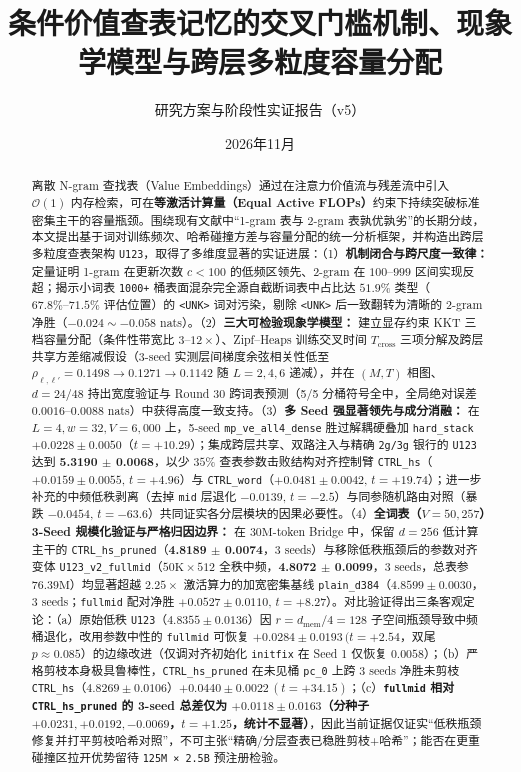 \documentclass[10.5pt,a4paper]{ctexart}
\title{\textbf{条件价值查表记忆的交叉门槛机制、现象学模型与跨层多粒度容量分配}}
\author{研究方案与阶段性实证报告（v5）}
\date{2026年11月}
\begin{document}
\maketitle

\begin{abstract}
\noindent
离散 N-gram 查找表（Value Embeddings）通过在注意力价值流与残差流中引入 $\mathcal{O}(1)$ 内存检索，可在\textbf{等激活计算量（Equal Active FLOPs）}约束下持续突破标准密集主干的容量瓶颈。围绕现有文献中“1-gram 表与 2-gram 表孰优孰劣”的长期分歧，本文提出基于词对训练频次、哈希碰撞方差与容量分配的统一分析框架，并构造出跨层多粒度查表架构 \texttt{U123}，取得了多维度显著的实证进展：（1）\textbf{机制闭合与跨尺度一致律：} 定量证明 1-gram 在更新次数 $c<100$ 的低频区领先、2-gram 在 $100\text{--}999$ 区间实现反超；揭示小词表 \texttt{1000+} 桶表面混杂完全源自截断词表中占比达 $51.9\%$ 类型（$67.8\%\text{--}71.5\%$ 评估位置）的 \texttt{<UNK>} 词对污染，剔除 \texttt{<UNK>} 后一致翻转为清晰的 2-gram 净胜（$-0.024 \sim -0.058$ nats）。（2）\textbf{三大可检验现象学模型：} 建立显存约束 KKT 三档容量分配（条件性带宽比 $3\text{--}12\times$）、Zipf--Heaps 训练交叉时间 $T_{\text{cross}}$ 三项分解及跨层共享方差缩减假设（3-seed 实测层间梯度余弦相关性低至 $\rho_{\ell,\ell'} = 0.1498 \to 0.1271 \to 0.1142$ 随 $L=2,4,6$ 递减），并在 $(M,T)$ 相图、$d=24/48$ 持出宽度验证与 Round 30 跨词表预测（5/5 分桶符号全中，全局绝对误差 $0.0016\text{--}0.0088$ nats）中获得高度一致支持。（3）\textbf{多 Seed 强显著领先与成分消融：} 在 $L=4,w=32,V=6{,}000$ 上，5-seed \texttt{mp\_ve\_all4\_dense} 胜过解耦硬叠加 \texttt{hard\_stack} $+0.0228 \pm 0.0050$（$t=+10.29$）；集成跨层共享、双路注入与精确 \texttt{2g/3g} 银行的 \texttt{U123} 达到 \textbf{5.3190 $\pm$ 0.0068}，以少 $35\%$ 查表参数击败结构对齐控制臂 \texttt{CTRL\_hs}（$+0.0159 \pm 0.0055, \, t=+4.96$）与 \texttt{CTRL\_word}（$+0.0481 \pm 0.0042, \, t=+19.74$）；进一步补充的中频低秩剥离（去掉 \texttt{mid} 层退化 $-0.0139, \, t=-2.5$）与同参随机路由对照（暴跌 $-0.0454, \, t=-63.6$）共同证实各分层模块的因果必要性。（4）\textbf{全词表（$V=50{,}257$）3-Seed 规模化验证与严格归因边界：} 在 $30\text{M}$-token Bridge 中，保留 $d=256$ 低计算主干的 \texttt{CTRL\_hs\_pruned}（\textbf{4.8189 $\pm$ 0.0074}，3 seeds）与移除低秩瓶颈后的参数对齐变体 \texttt{U123\_v2\_fullmid}（$50\text{K} \times 512$ 全秩中频，\textbf{4.8072 $\pm$ 0.0099}，3 seeds，总表参 $76.39\text{M}$）均显著超越 $2.25\times$ 激活算力的加宽密集基线 \texttt{plain\_d384}（$4.8599 \pm 0.0030$，3 seeds；\texttt{fullmid} 配对净胜 \textbf{$+0.0527 \pm 0.0110, \, t=+8.27$}）。对比验证得出三条客观定论：（a）原始低秩 \texttt{U123}（$4.8355 \pm 0.0136$）因 $r=d_{\mathrm{mem}}/4=128$ 子空间瓶颈导致中频桶退化，改用参数中性的 \texttt{fullmid} 可恢复 $+0.0284 \pm 0.0193\,(t=+2.54$，双尾 $p\approx 0.085$）的边缘改进（仅调对齐初始化 \texttt{initfix} 在 Seed 1 仅恢复 $0.0058$）；（b）严格剪枝本身极具鲁棒性，\texttt{CTRL\_hs\_pruned} 在未见桶 \texttt{pc\_0} 上跨 3 seeds 净胜未剪枝 \texttt{CTRL\_hs}（$4.8269 \pm 0.0106$）$+0.0440 \pm 0.0022\,(t=+34.15)$；（c）\textbf{\texttt{fullmid} 相对 \texttt{CTRL\_hs\_pruned} 的 3-seed 总差仅为 $+0.0118 \pm 0.0163$（分种子 $+0.0231, +0.0192, -0.0069$，$t=+1.25$，统计不显著）}，因此当前证据仅证实“低秩瓶颈修复并打平剪枝哈希对照”，不可主张“精确/分层查表已稳胜剪枝+哈希”；能否在更重碰撞区拉开优势留待 \texttt{125M × 2.5B} 预注册检验。

\end{abstract}
\end{document}
